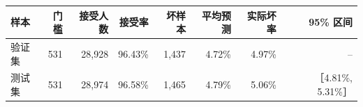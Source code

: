 \begin{tabular}{lrrrrrrr}
\toprule
样本 & 门槛 & 接受人数 & 接受率 & 坏样本 & 平均预测 & 实际坏率 & 95\% 区间 \\
\midrule
验证集 & 531 & 28,928 & 96.43\% & 1,437 & 4.72\% & 4.97\% & -- \\
测试集 & 531 & 28,974 & 96.58\% & 1,465 & 4.79\% & 5.06\% & ［4.81\%, 5.31\%］ \\
\bottomrule
\end{tabular}

